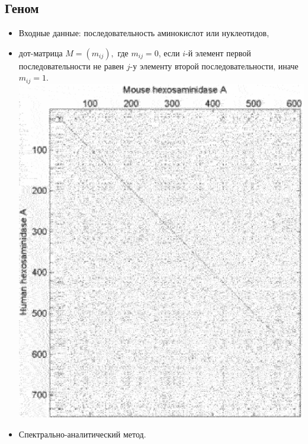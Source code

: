 \documentclass[smaller]{beamer}
\begin{document}
\subsection{Геном}
\begin{frame}
\begin{itemize}
    \item Входные данные: последовательность аминокислот или нуклеотидов,
    \item дот-матрица $M=(m_{ij}),$ где $m_{ij}=0$, если $i$-й элемент первой последовательности не равен $j$-у 
    элементу второй последовательности, иначе $m_{ij}=1$. \\
    \includegraphics[scale=0.22]{plot.eps}
    \item Спектрально-аналитический метод.
\end{itemize}      
\end{frame}
\end{document}
